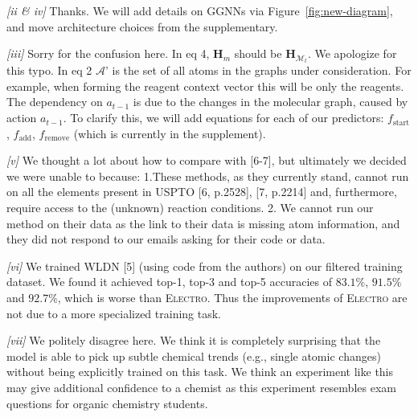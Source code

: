 \documentclass{article}
\newcommand{\ourModel}{\textsc{Electro}\xspace}
\begin{document}
\emph{[ii \& iv]}
Thanks. We will add details on GGNNs via Figure~\ref{fig:new-diagram}, and move architecture choices from the supplementary.

\emph{[iii]} 
Sorry for the confusion here. In eq 4, $\mathbf{H}_m$ should be $\mathbf{H}_{\mathcal{M}_t}$. We apologize for this typo.
In eq 2 $\mathcal{A}’$ is the set of all atoms in the graphs under consideration. For example, when forming the reagent context vector this will be only the reagents.
The dependency on $a_{t-1}$ is due to the changes in the molecular graph, caused by action $a_{t-1}$. 
To clarify this, we will add equations for each of our predictors: $f_\textrm{start}$, $f_\textrm{add}$, $f_\textrm{remove}$ (which is currently in the supplement).

\emph{[v]} 
We thought a lot about how to compare with [6-7], but
 ultimately we decided we were unable to because:
  1.These methods, as they currently stand, cannot run on all the elements present in USPTO [6, p.2528], [7, p.2214] and, furthermore, require access to the (unknown) reaction conditions. 
 2. We cannot run our method on their data as the link to their data is missing atom information, and they did not respond to our emails asking for their code or data. 

\emph{[vi]} We trained WLDN [5] (using code from the authors) on our filtered training dataset.
 We found it achieved top-1, top-3 and top-5 accuracies of $83.1\%$, $91.5\%$ and $92.7\%$, which is worse than \ourModel. 
 Thus the improvements of \ourModel are not due to a more specialized training task.
  
\emph{[vii]}
 We politely disagree here.
  We think it is completely surprising that the model is able to pick up subtle chemical trends (e.g., single atomic changes) without being explicitly trained on this task.
   We think an experiment like this may give additional confidence to a chemist %
   as this experiment resembles exam questions for organic chemistry students. %
 
\end{document}
